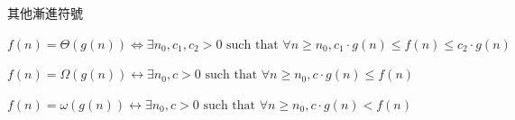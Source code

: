 \begin{frame}{其他漸進符號}
    \begin{definition}[$\Theta$]
        $f(n) = \Theta(g(n)) \Leftrightarrow \exists n_0, c_1, c_2 > 0 \text{ such that } \forall n \ge n_0, c_1 \cdot g(n) \le f(n) \le c_2 \cdot g(n)$
    \end{definition}

    \begin{definition}[$\Omega$]
        $f(n) = \Omega(g(n)) \leftrightarrow \exists n_0, c > 0 \text{ such that } \forall n \ge n_0, c \cdot g(n) \le f(n)$
    \end{definition}

    \begin{definition}[$\omega$]
        $f(n) = \omega(g(n)) \leftrightarrow \exists n_0, c > 0 \text{ such that } \forall n \ge n_0, c \cdot g(n) < f(n)$
    \end{definition}
\end{frame}